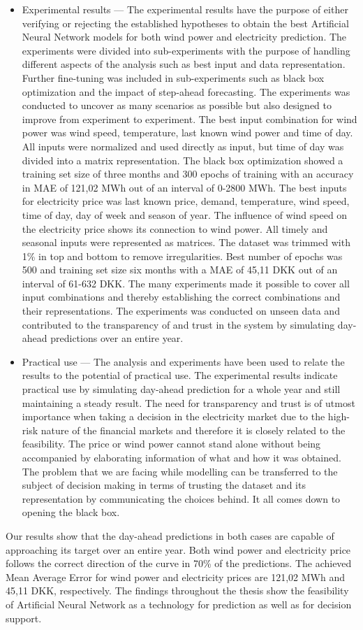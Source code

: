 \begin{itemize}
\item Experimental results --- The experimental results have the purpose of either verifying or rejecting the established hypotheses to obtain the best Artificial Neural Network models for both wind power and electricity prediction. The experiments were divided into sub-experiments with the purpose of handling different aspects of the analysis such as best input and data representation. Further fine-tuning was included in sub-experiments such as black box optimization and the impact of step-ahead forecasting. The experiments was conducted to uncover as many scenarios as possible but also designed to improve from experiment to experiment. The best input combination for wind power was wind speed, temperature, last known wind power and time of day. All inputs were normalized and used directly as input, but time of day was divided into a matrix representation. The black box optimization showed a training set size of three months and 300 epochs of training with an accuracy in MAE of 121,02 MWh out of an interval of 0-2800 MWh. The best inputs for electricity price was last known price, demand, temperature, wind speed, time of day, day of week and season of year. The influence of wind speed on the electricity price shows its connection to wind power. All timely and seasonal inputs were represented as matrices. The dataset was trimmed with 1\% in top and bottom to remove irregularities. Best number of epochs was 500 and training set size six months with a MAE of 45,11 DKK out of an interval of 61-632 DKK. The many experiments made it possible to cover all input combinations and thereby establishing the correct combinations and their representations. The experiments was conducted on unseen data and contributed to the transparency of and trust in the system by simulating day-ahead predictions over an entire year.
\item Practical use --- The analysis and experiments have been used to relate the results to the potential of practical use. The experimental results indicate practical use by simulating day-ahead prediction for a whole year and still maintaining a steady result. The need for transparency and trust is of utmost importance when taking a decision in the electricity market due to the high-risk nature of the financial markets and therefore it is closely related to the feasibility. The price or wind power cannot stand alone without being accompanied by elaborating information of what and how it was obtained. The problem that we are facing while modelling can be transferred to the subject of decision making in terms of trusting the dataset and its representation by communicating the choices behind. It all comes down to opening the black box.
\end{itemize}

\noindent Our results show that the day-ahead predictions in both cases are capable of approaching its target over an entire year. Both wind power and electricity price follows the correct direction of the curve in 70\% of the predictions. The achieved Mean Average Error for wind power and electricity prices are 121,02 MWh and 45,11 DKK, respectively. The findings throughout the thesis show the feasibility of Artificial Neural Network as a technology for prediction as well as for decision support.  